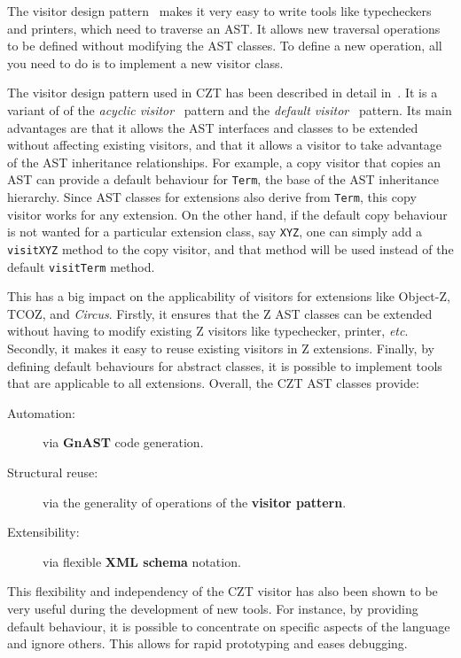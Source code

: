 \documentclass{llncs}
\newcommand{\Circus}{{\sf\slshape Circus}}
\newcommand{\Interface}[1]{\texttt{#1}}
\begin{document}
  The visitor design pattern~\cite{GamEA:95,MaiCha:01} makes it very
  easy to write tools like typecheckers and printers, which need to
  traverse an AST.  It allows new traversal operations to be defined
  without modifying the AST classes.  To define a new operation, all
  you need to do is to implement a new visitor class.

  The visitor design pattern used in CZT has been described in detail
  in~\cite{czt}.  It is a variant of of the \emph{acyclic
  visitor}~\cite{Mar:97} pattern and the \emph{default
  visitor}~\cite{Nor:97} pattern.  Its main advantages are that it
  allows the AST interfaces and classes to be extended without
  affecting existing visitors, and that it allows a visitor to take
  advantage of the AST inheritance relationships.
  For example, a copy visitor that copies an AST can
  provide a default behaviour for \Interface{Term}, the base of the
  AST inheritance hierarchy.  Since AST classes for extensions also
  derive from \Interface{Term}, this copy visitor works for any
  extension.  On the other hand, if the default copy behaviour is not
  wanted for a particular extension class, say \texttt{XYZ}, one can
  simply add a \texttt{visitXYZ} method to the copy visitor, and that
  method will be used instead of the default \texttt{visitTerm}
  method.

  This has a big impact on the applicability of visitors for
  extensions like Object-Z, TCOZ, and \Circus.  Firstly, it ensures
  that the Z AST classes can be extended without having to modify
  existing Z visitors like typechecker, printer,
  \textit{etc}. Secondly, it makes it easy to reuse existing visitors
  in Z extensions.  Finally, by defining default behaviours for abstract
  classes, it is possible to implement tools that are applicable to
  all extensions.
  Overall, the CZT AST classes provide:
  \begin{description}
    \item[Automation:] via \textbf{GnAST} code generation.
    \item[Structural reuse:] via the generality of operations of the \textbf{visitor pattern}.
    \item[Extensibility:] via flexible \textbf{XML schema} notation.
  \end{description}

  This flexibility and independency of the CZT visitor has also been
  shown to be very useful during the development of new tools.  For instance, by
  providing default behaviour, it is possible to concentrate on
  specific aspects of the language and ignore others.  This allows for
  rapid prototyping and eases debugging.
\end{document}
